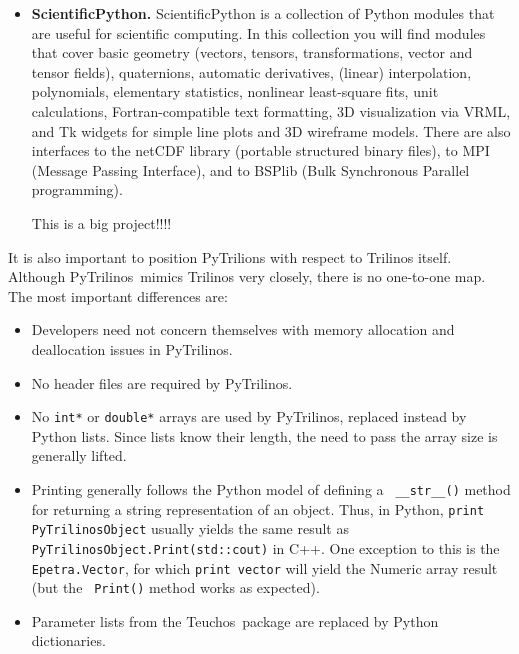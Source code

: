 \documentclass[10pt,relax]{SANDreport}
\newcommand{\PyTrilinos}{{PyTrilinos}}
\newcommand{\teuchos}{{Teuchos}}
\begin{document}
\begin{itemize}
\item {\bf ScientificPython.}  ScientificPython is a collection of
  Python modules that are useful for scientific computing. In this
  collection you will find modules that cover basic geometry (vectors,
  tensors, transformations, vector and tensor fields), quaternions,
  automatic derivatives, (linear) interpolation, polynomials,
  elementary statistics, nonlinear least-square fits, unit
  calculations, Fortran-compatible text formatting, 3D visualization
  via VRML, and Tk widgets for simple line plots and 3D wireframe
  models. There are also interfaces to the netCDF library (portable
  structured binary files), to MPI (Message Passing Interface), and to
  BSPlib (Bulk Synchronous Parallel programming).

  This is a big project!!!!

\end{itemize}

It is also important to position PyTrilions with respect to Trilinos
itself.  Although \PyTrilinos\ mimics Trilinos very closely, there is
no one-to-one map. The most important differences are:

\begin{itemize}

\item Developers need not concern themselves with memory allocation
  and deallocation issues in \PyTrilinos.

\item No header files are required by \PyTrilinos.

\item No {\tt int*} or {\tt double*} arrays are used by \PyTrilinos,
  replaced instead by Python lists.  Since lists know their length,
  the need to pass the array size is generally lifted.

\item Printing generally follows the Python model of defining a {\tt
  \_\_str\_\_()} method for returning a string representation of an
  object.  Thus, in Python, {\tt print PyTrilinosObject} usually
  yields the same result as {\tt PyTrilinosObject.Print(std::cout)} in
  C++.  One exception to this is the {\tt Epetra.Vector}, for which
  {\tt print vector} will yield the Numeric array result (but the {\tt
    Print()} method works as expected).

\item Parameter lists from the \teuchos\ package are replaced by Python
  dictionaries.

\end{itemize}
\end{document}

